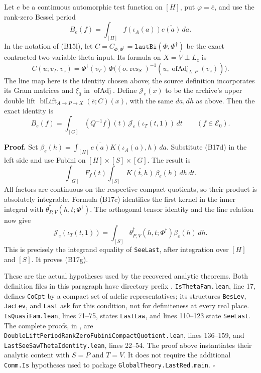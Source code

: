 \documentclass[11pt]{article}
\theoremstyle{definition}\newtheorem{definition}[theorem]{Definition}\newtheorem{remark}[theorem]{Remark}
\begin{document}
Let $e$ be a continuous automorphic test function on $[H]$, put
$\varphi=\overline e$, and use the rank-zero Bessel period
\[
 B_e(f)=\int_{[H]}f(\iota_A(a))\overline{e(a)}\,da .
\]
In the notation of (B15l), let
$C=C_{\Phi,\Phi^\dagger}=\texttt{lastBi}(\Phi,\Phi^\dagger)$
be the exact contracted two-variable theta input. Its formula
on $X=V\perp L_z$ is
\[
 C(u;v_T,v_z)
     =\Phi^\dagger(v_T)\,
       \Phi\bigl((o.\operatorname{res}_S)^{-1}
                       (u,\operatorname{ofAdj}_{L,P}(v_z))\bigr).
\]
The line map here is the identity chosen above; the source
definition incorporates its Gram matrices and $\xi_0$ in
$\operatorname{ofAdj}$. Define $\mathcal J_e(x)$ to be the
archive's upper double lift
$\operatorname{biLift}_{A\to P\to X}(\overline e;C)(x)$,
with the same $da,dh$ as above. Then the exact identity is
\begin{equation}
 B_e(f)=\int_{[G]}(Q^{-1}f)(t)\,
                 \mathcal J_e(\iota_T(t,1))\,dt
       \qquad(f\in\mathcal E_0).
\tag{B17g}
\end{equation}

\textbf{Proof.}
Set
$\beta_e(h)=\int_{[H]}\overline{e(a)}K(\iota_A(a),h)\,da$.
Substitute (B17d) in the left side and use Fubini on
$[H]\times[S]\times[G]$. The result is
\[
 \int_{[G]}F_f(t)\int_{[S]}
       \overline{K(t,h)}\,\beta_e(h)\,dh\,dt.
\]
All factors are continuous on the respective compact quotients,
so their product is absolutely integrable. Formula (B17c)
identifies the first kernel in the inner integral with
$\theta^\dagger_{P,V}(h,t;\Phi^\dagger)$.
The orthogonal tensor identity and the line relation now give
\[
 \mathcal J_e(\iota_T(t,1))
       =\int_{[S]}\theta^\dagger_{P,V}(h,t;\Phi^\dagger)
                         \beta_e(h)\,dh .
\]
This is precisely the integrand equality of
\texttt{SeeLast}, after integration over $[H]$ and $[S]$.
It proves (B17g).

These are the actual hypotheses used by the recovered analytic
theorems. Both definition files in this paragraph have directory
prefix
.
\texttt{IsThetaFam.lean}, line 17, defines
\texttt{CoCpt} by a compact set of adelic representatives;
its structures \texttt{BesLev}, \texttt{JacLev}, and
\texttt{Last} ask for this condition, not for definiteness at
every real place. \texttt{IsQuasiFam.lean}, lines 71--75,
states \texttt{LastLaw}, and lines 110--123 state
\texttt{SeeLast}. The complete proofs, in
, are
\nolinkurl{DoubleLiftPeriodRankZeroFubiniCompactQuotient.lean},
lines 136--159, and \nolinkurl{LastSeeSawThetaIdentity.lean},
lines 22--54. The proof above instantiates their analytic
content with $S=P$ and $T=V$. It does not require the
additional \texttt{Comm.Is} hypotheses used to package
\nolinkurl{GlobalTheory.LastRed.main}. \hfill$\square$
\end{document}
